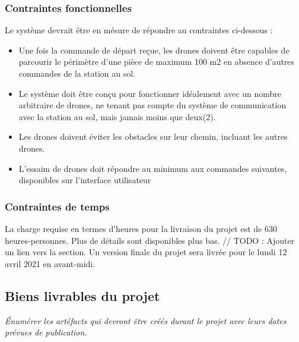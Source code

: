 \documentclass{mistcoursedoc}
\begin{document}
\subsubsection{Contraintes fonctionnelles}
Le système devrait être en mésure de répondre au contraintes ci-dessous :

\begin{itemize}
  \item Une fois la commande de départ reçue, les drones doivent être capables de parcourir le périmètre 
  d’une pièce de maximum 100 m2 en absence d’autres commandes de la station au sol.
  \item Le système doit être conçu pour fonctionner idéalement avec un nombre arbitraire de drones, 
  ne tenant pas compte du système de communication avec la station au sol, mais jamais moins que deux(2).
  \item Les drones doivent éviter les obstacles sur leur chemin, incluant les autres drones.
  \item L’essaim de drones doit répondre au minimum aux commandes suivantes, disponibles sur l’interface utilisateur
\end{itemize}

\subsubsection{Contraintes de temps}
La charge requise en termes d’heures pour la livraison du projet est de 630 heures-personnes. 
Plus de détails sont disponibles plus bas. // TODO : Ajouter un lien vers la section.
Un version finale du projet sera livrée pour le lundi 12 avril 2021 en avant-midi.


\subsection{Biens livrables du projet}
\textit{Énumérer les artéfacts qui devront être créés durant le projet avec leurs dates prévues de publication.}
\end{document}
